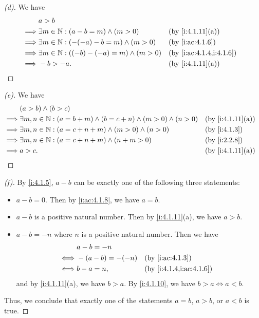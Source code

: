 \begin{proof}[(d)]
  We have
  \begin{align*}
             & a > b                                                                           \\
    \implies & \exists m \in \N : (a - b = m) \land (m > 0)       &  & \by{i:4.1.11}[a]        \\
    \implies & \exists m \in \N : (-(-a) - b = m) \land (m > 0)   &  & \by{i:ac:4.1.6}         \\
    \implies & \exists m \in \N : ((-b) - (-a) = m) \land (m > 0) &  & \by{i:ac:4.1.4,i:4.1.6} \\
    \implies & -b > -a.                                           &  & \by{i:4.1.11}[a]
  \end{align*}
\end{proof}

\begin{proof}[(e)]
  We have
  \begin{align*}
             & (a > b) \land (b > c)                                                                                 \\
    \implies & \exists m, n \in \N : (a = b + m) \land (b = c + n) \land (m > 0) \land (n > 0) &  & \by{i:4.1.11}[a] \\
    \implies & \exists m, n \in \N : (a = c + n + m) \land (m > 0) \land (n > 0)               &  & \by{i:4.1.3}     \\
    \implies & \exists m, n \in \N : (a = c + n + m) \land (n + m > 0)                         &  & \by{i:2.2.8}     \\
    \implies & a > c.                                                                          &  & \by{i:4.1.11}[a]
  \end{align*}
\end{proof}

\begin{proof}[(f)]
  By \cref{i:4.1.5}, \(a - b\) can be exactly one of the following three statements:
  \begin{itemize}
    \item \(a - b = 0\).
          Then by \cref{i:ac:4.1.8}, we have \(a = b\).
    \item \(a - b\) is a positive natural number.
          Then by \cref{i:4.1.11}(a), we have \(a > b\).
    \item \(a - b = -n\) where \(n\) is a positive natural number.
          Then we have
          \begin{align*}
                 & a - b = -n                                    \\
            \iff & -(a - b) = -(-n) &  & \by{i:ac:4.1.3}         \\
            \iff & b - a = n,       &  & \by{i:4.1.4,i:ac:4.1.6}
          \end{align*}
          and by \cref{i:4.1.11}(a), we have \(b > a\).
          By \cref{i:4.1.10}, we have \(b > a \iff a < b\).
  \end{itemize}
  Thus, we conclude that exactly one of the statements \(a = b\), \(a > b\), or \(a < b\) is true.
\end{proof}


